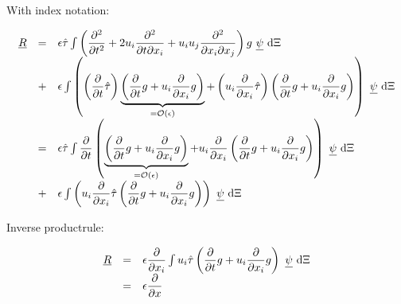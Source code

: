 \documentclass[
	pdftex,             %
	12pt,				%
	a4paper,		   	%
	english,				%
	oneside,			%
]{article}
\newcommand{\uu}[1]{\underline{#1}}
\newcommand{\pdxi}{~\uu{\psi}~\textnormal{d}\Xi}
\newcommand{\pp}[1]{\dfrac{\partial}{\partial #1}}
\newcommand{\ppt}{\pp{t}}
\newcommand{\ppx}{\pp{x}}
\begin{document}
With index notation:

\begin{equation}
\begin{array}{lcl}
\uu{R} &=& \epsilon \hat{\tau} \int \left( \dfrac{\partial^2}{\partial t^2} 
                                       + 2 u_i \dfrac{\partial^2}{\partial t \partial x_i}
                                       + u_i u_j \dfrac{\partial^2}{\partial x_i \partial x_j}
                                  \right) g \pdxi \\
       &+& \epsilon \int \left( \left( \ppt \hat{\tau} \right)
                                       \underbrace{\left( \ppt g + u_i \pp{x_i} g \right)
                                                }_{ = \mathcal{O}\left( \epsilon \right) }
                              + \left( u_i \pp{x_i} \hat{\tau} \right) \left( \ppt g + u_i \pp{x_i} g \right)
                         \right) \pdxi \\
       &=& \epsilon \hat{\tau} \int \ppt \left( \underbrace{\left( \ppt g + u_i \pp{x_i} g \right)
                                                }_{ = \mathcal{O}\left( \epsilon \right) }
                                          + u_i \pp{x_i} \left( \ppt g + u_i \pp{x_i} g
                                  \right) \right) \pdxi \\
       &+& \epsilon \int \left( u_i \pp{x_i} \hat{\tau} \left( \ppt g + u_i \pp{x_i} g \right) \right) \pdxi \\
\end{array}
\end{equation}

Inverse productrule:

\begin{equation}
\begin{array}{lcl}
\uu{R} &=& \epsilon \pp{x_i} \int u_i \hat{\tau} \left( \ppt g + u_i \pp{x_i} g \right) \pdxi \\
       &=& \epsilon \ppx 
\end{array}
\end{equation}
\end{document}
